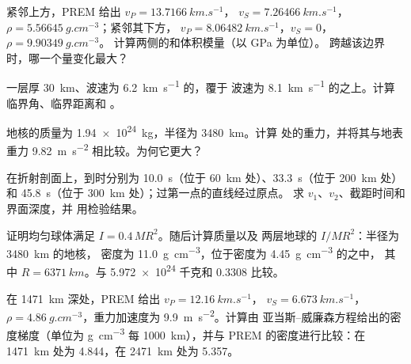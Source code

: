 \begin{exercise}[$\star$]\label{exo:b1:layered-earth:2}
紧邻上方，PREM 给出 $v_P = \qty{13.7166}{km.s^{-1}}$，
$v_S = \qty{7.26466}{km.s^{-1}}$，$\rho = \qty{5.56645}{g.cm^{-3}}$；紧邻其下方，
$v_P = \qty{8.06482}{km.s^{-1}}$，$v_S = 0$，$\rho = \qty{9.90349}{g.cm^{-3}}$。
计算两侧的和体积模量（以 GPa 为单位）。
跨越该边界时，哪一个量变化最大？
\end{exercise}

\begin{exercise}[$\star$]\label{exo:b1:layered-earth:3}
一层厚 \qty{30}{km}、波速为 \qty{6.2}{km.s^{-1}} 的，覆于
波速为 \qty{8.1}{km.s^{-1}} 的之上。计算临界角、临界距离和
。
\end{exercise}

\begin{exercise}[$\star$]\label{exo:b1:layered-earth:4}
地核的质量为 \qty{1.94e24}{kg}，半径为 \qty{3480}{km}。计算
处的重力，并将其与地表重力
\qty{9.82}{m.s^{-2}} 相比较。为何它更大？
\end{exercise}

\begin{exercise}[$\star\star$]\label{exo:b1:layered-earth:5}
在折射剖面上，到时分别为 \qty{10.0}{s}（位于
\qty{60}{km} 处）、\qty{33.3}{s}（位于 \qty{200}{km} 处）和 \qty{45.8}{s}（位于
\qty{300}{km} 处）；过第一点的直线经过原点。
求 $v_1$、$v_2$、截距时间和界面深度，并
用检验结果。
\end{exercise}

\begin{exercise}[$\star\star$]\label{exo:b1:layered-earth:6}
证明均匀球体满足 $I = 0.4\,MR^2$。随后计算质量以及
两层地球的 $I/MR^2$：半径为 \qty{3480}{km} 的地核，
密度为 \qty{11.0}{g.cm^{-3}}，位于密度为 \qty{4.45}{g.cm^{-3}} 的之中，
其中 $R = \qty{6371}{km}$。与 \num{5.972e24} 千克和 $0.3308$ 比较。
\end{exercise}

\begin{exercise}[$\star\star$]\label{exo:b1:layered-earth:7}
在 \qty{1471}{km} 深处，PREM 给出 $v_P = \qty{12.16}{km.s^{-1}}$，
$v_S = \qty{6.673}{km.s^{-1}}$，$\rho = \qty{4.86}{g.cm^{-3}}$，重力加速度为
\qty{9.9}{m.s^{-2}}。计算由
亚当斯–威廉森方程给出的密度梯度（单位为 \unit{g.cm^{-3}} 每 \qty{1000}{km}），并与
PREM 的密度进行比较：在 \qty{1471}{km} 处为 \num{4.844}，在
\qty{2471}{km} 处为 \num{5.357}。
\end{exercise}

